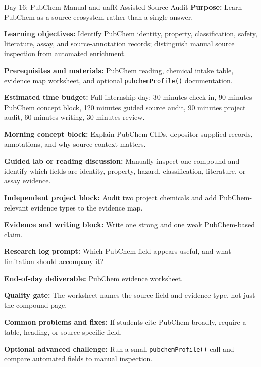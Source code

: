 \begin{dailybox}{Day 16: PubChem Manual and uafR-Assisted Source Audit}
\textbf{Purpose:} Learn PubChem as a source ecosystem rather than a single answer.

\textbf{Learning objectives:} Identify PubChem identity, property, classification, safety, literature, assay, and source-annotation records; distinguish manual source inspection from automated enrichment.

\textbf{Prerequisites and materials:} PubChem reading, chemical intake table, evidence map worksheet, and optional \texttt{pubchemProfile()} documentation.

\textbf{Estimated time budget:} Full internship day: 30 minutes check-in, 90 minutes PubChem concept block, 120 minutes guided source audit, 90 minutes project audit, 60 minutes writing, 30 minutes review.

\textbf{Morning concept block:} Explain PubChem CIDs, depositor-supplied records, annotations, and why source context matters.

\textbf{Guided lab or reading discussion:} Manually inspect one compound and identify which fields are identity, property, hazard, classification, literature, or assay evidence.

\textbf{Independent project block:} Audit two project chemicals and add PubChem-relevant evidence types to the evidence map.

\textbf{Evidence and writing block:} Write one strong and one weak PubChem-based claim.

\textbf{Research log prompt:} Which PubChem field appears useful, and what limitation should accompany it?

\textbf{End-of-day deliverable:} PubChem evidence worksheet.

\textbf{Quality gate:} The worksheet names the source field and evidence type, not just the compound page.

\textbf{Common problems and fixes:} If students cite PubChem broadly, require a table, heading, or source-specific field.

\textbf{Optional advanced challenge:} Run a small \texttt{pubchemProfile()} call and compare automated fields to manual inspection.
\end{dailybox}

